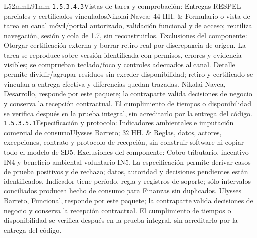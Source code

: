 \begin{longtable}{L{52mm}L{91mm}}
\texttt{1.\allowbreak{}5.\allowbreak{}3.\allowbreak{}4.\allowbreak{}3}\newline Vistas de tarea y comprobación: Entregas RESPEL parciales y certificados vinculados\newline Nikolai Navea; 44 HH. & Formulario o vista de tarea en canal móvil/portal autorizado, validación funcional y de acceso; reutiliza navegación, sesión y cola de 1.7, sin reconstruirlos. Exclusiones del componente: Otorgar certificación externa y borrar retiro real por discrepancia de origen. La tarea se reproduce sobre versión identificada con permisos, errores y evidencia visibles; se comprueban teclado/foco y controles adecuados al canal. Detalle permite dividir/agrupar residuos sin exceder disponibilidad; retiro y certificado se vinculan a entrega efectiva y diferencias quedan trazadas. Nikolai Navea, Desarrollo, responde por este paquete; la contraparte valida decisiones de negocio y conserva la recepción contractual. El cumplimiento de tiempos o disponibilidad se verifica después en la prueba integral, sin acreditarlo por la entrega del código.\\\hline
\texttt{1.\allowbreak{}5.\allowbreak{}3.\allowbreak{}5.\allowbreak{}1}\newline Especificación y protocolo: Indicadores ambientales e imputación comercial de consumo\newline Ulysses Barreto; 32 HH. & Reglas, datos, actores, excepciones, contrato y protocolo de recepción, sin construir software ni copiar todo el modelo de SD5. Exclusiones del componente: Cobro tributario, incentivo IN4 y beneficio ambiental voluntario IN5. La especificación permite derivar casos de prueba positivos y de rechazo; datos, autoridad y decisiones pendientes están identificados. Indicador tiene período, regla y registros de soporte; sólo intervalos conciliados producen hecho de consumo para Finanzas sin duplicados. Ulysses Barreto, Funcional, responde por este paquete; la contraparte valida decisiones de negocio y conserva la recepción contractual. El cumplimiento de tiempos o disponibilidad se verifica después en la prueba integral, sin acreditarlo por la entrega del código.\\\hline

\end{longtable}
